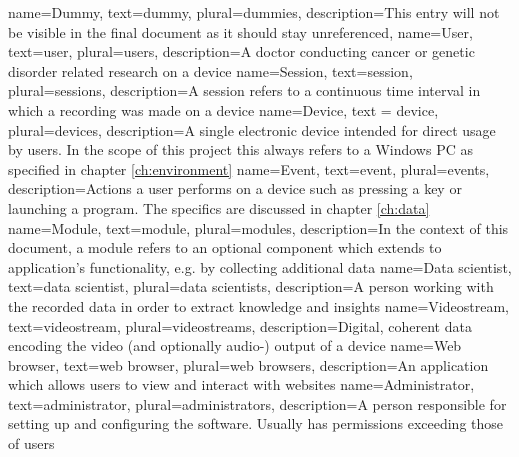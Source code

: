 \label{ch:glossary}

{
	name=Dummy, %
	text=dummy, %
	plural=dummies, %
	description={This entry will not be visible in the final document as it should stay unreferenced}, %
}
{
	name=User,
	text=user,
	plural=users,
	description={A doctor conducting cancer or genetic disorder related research on a \gls{device}}
}
{
	name=Session,
	text=session,
	plural=sessions,
	description={A session refers to a continuous time interval in which a recording was made on a \gls{device}}
}
{
	name=Device,
	text = device,
	plural=devices,
	description={A single electronic device intended for direct usage by \glspl{user}. In the scope of this project this always refers to a Windows PC as specified in chapter \ref{ch:environment}}
}
{
	name=Event,
	text=event,
	plural=events,
	description={Actions a user performs on a \gls{device} such as pressing a key or launching a program. The specifics are discussed in chapter \ref{ch:data}}
}
{
	name=Module,
	text=module,
	plural=modules,
	description={In the context of this document, a module refers to an optional component which extends to application's functionality, e.g. by collecting additional data}
}
{
	name=Data scientist,
	text=data scientist,
	plural=data scientists,
	description={A person working with the recorded data in order to extract knowledge and insights}
}
{
	name=Videostream,
	text=videostream,
	plural=videostreams,
	description={Digital, coherent data encoding the video (and optionally audio-) output of a \gls{device}}
}
   {
   	name=Web browser,
   	text=web browser,
   	plural=web browsers,
	description={An application which allows \glspl{user} to view and interact with websites}
}
{
	name=Administrator,
	text=administrator,
	plural=administrators,
	description={A person responsible for setting up and configuring the software. Usually has permissions exceeding those of \glspl{user}}
}